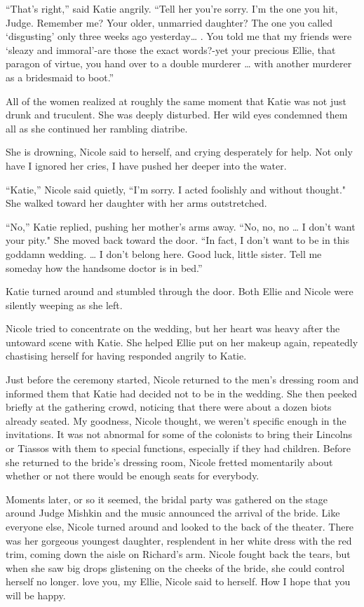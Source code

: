 \documentclass[]{article}
\begin{document}
{“That’s right,” said Katie angrily.  “Tell her you’re sorry.  I’m the one you hit, Judge.  Remember me? Your older, unmarried daughter? The one you called ‘disgusting’ only three weeks ago yesterday… .  You told me that my friends were ‘sleazy and immoral’-are those the exact words?-yet your precious Ellie, that paragon of virtue, you hand over to a double murderer … with another murderer as a bridesmaid to boot.”

All of the women realized at roughly the same moment that Katie was not just drunk and truculent.  She was deeply disturbed.  Her wild eyes condemned them all as she continued her rambling diatribe.

She is drowning, Nicole said to herself, and crying desperately for help.  Not only have I ignored her cries, I have pushed her deeper into the water.

“Katie,” Nicole said quietly, “I’m sorry.  I acted foolishly and without thought."  She walked toward her daughter with her arms outstretched.

“No,” Katie replied, pushing her mother’s arms away.  “No, no, no … I don’t want your pity."  She moved back toward the door.  “In fact, I don’t want to be in this goddamn wedding.  … I don’t belong here.  Good luck, little sister.  Tell me someday how the handsome doctor is in bed.”

Katie turned around and stumbled through the door.  Both Ellie and Nicole were silently weeping as she left.

Nicole tried to concentrate on the wedding, but her heart was heavy after the untoward scene with Katie.  She helped Ellie put on her makeup again, repeatedly chastising herself for having responded angrily to Katie.

Just before the ceremony started, Nicole returned to the men’s dressing room and informed them that Katie had decided not to be in the wedding.  She then peeked briefly at the gathering crowd, noticing that there were about a dozen biots already seated.  My goodness, Nicole thought, we weren’t specific enough in the invitations.  It was not abnormal for some of the colonists to bring their Lincolns or Tiassos with them to special functions, especially if they had children.  Before she returned to the bride’s dressing room, Nicole fretted momentarily about whether or not there would be enough seats for everybody.

Moments later, or so it seemed, the bridal party was gathered on the stage around Judge Mishkin and the music announced the arrival of the bride.  Like everyone else, Nicole turned around and looked to the back of the theater.  There was her gorgeous youngest daughter, resplendent in her white dress with the red trim, coming down the aisle on Richard’s arm.  Nicole fought back the tears, but when she saw big drops glistening on the cheeks of the bride, she could control herself no longer.  love you, my Ellie, Nicole said to herself.  How I hope that you will be happy.

}
\end{document}
